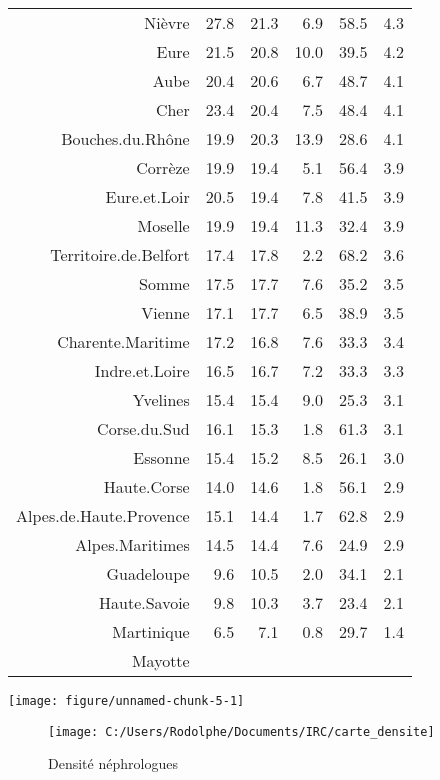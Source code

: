 \documentclass[11pt,a4paper]{article}\usepackage[]{graphicx}\usepackage[]{color}
\makeatletter
\def\maxwidth{ %
  \ifdim\Gin@nat@width>\linewidth
    \linewidth
  \else
    \Gin@nat@width
  \fi
}
\newenvironment{knitrout}{}{} %
\makeatother
\begin{document}
\begin{table}[H]
\begin{tabular}{rrrrrr}
  Nièvre & 27.8 & 21.3 & 6.9 & 58.5 & 4.3 \\ 
  Eure & 21.5 & 20.8 & 10.0 & 39.5 & 4.2 \\ 
  Aube & 20.4 & 20.6 & 6.7 & 48.7 & 4.1 \\ 
  Cher & 23.4 & 20.4 & 7.5 & 48.4 & 4.1 \\ 
  Bouches.du.Rhône & 19.9 & 20.3 & 13.9 & 28.6 & 4.1 \\ 
  Corrèze & 19.9 & 19.4 & 5.1 & 56.4 & 3.9 \\ 
  Eure.et.Loir & 20.5 & 19.4 & 7.8 & 41.5 & 3.9 \\ 
  Moselle & 19.9 & 19.4 & 11.3 & 32.4 & 3.9 \\ 
  Territoire.de.Belfort & 17.4 & 17.8 & 2.2 & 68.2 & 3.6 \\ 
  Somme & 17.5 & 17.7 & 7.6 & 35.2 & 3.5 \\ 
  Vienne & 17.1 & 17.7 & 6.5 & 38.9 & 3.5 \\ 
  Charente.Maritime & 17.2 & 16.8 & 7.6 & 33.3 & 3.4 \\ 
  Indre.et.Loire & 16.5 & 16.7 & 7.2 & 33.3 & 3.3 \\ 
  Yvelines & 15.4 & 15.4 & 9.0 & 25.3 & 3.1 \\ 
  Corse.du.Sud & 16.1 & 15.3 & 1.8 & 61.3 & 3.1 \\ 
  Essonne & 15.4 & 15.2 & 8.5 & 26.1 & 3.0 \\ 
  Haute.Corse & 14.0 & 14.6 & 1.8 & 56.1 & 2.9 \\ 
  Alpes.de.Haute.Provence & 15.1 & 14.4 & 1.7 & 62.8 & 2.9 \\ 
  Alpes.Maritimes & 14.5 & 14.4 & 7.6 & 24.9 & 2.9 \\ 
  Guadeloupe & 9.6 & 10.5 & 2.0 & 34.1 & 2.1 \\ 
  Haute.Savoie & 9.8 & 10.3 & 3.7 & 23.4 & 2.1 \\ 
  Martinique & 6.5 & 7.1 & 0.8 & 29.7 & 1.4 \\ 
  Mayotte &  &  &  &  &  \\ 
   \hline
\end{tabular}
\end{table}



\begin{knitrout}
\color{fgcolor}
\texttt{[image: figure/unnamed-chunk-5-1]} 

\end{knitrout}

\begin{figure}[H]
	\centering
	\texttt{[image: C:/Users/Rodolphe/Documents/IRC/carte\_densite]}
	\caption{Densité néphrologues}
	\label{fig:cartedensite}
\end{figure}
\end{document}
